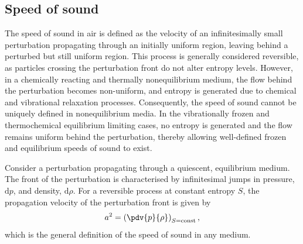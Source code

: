 \subsection{Speed of sound}
The speed of sound in air is defined as the velocity of an infinitesimally small perturbation propagating through an initially uniform region, leaving behind a perturbed but still uniform region. This process is generally considered reversible, as particles crossing the perturbation front do not alter entropy levels. However, in a chemically reacting and thermally nonequilibrium medium, the flow behind the perturbation becomes non-uniform, and entropy is generated due to chemical and vibrational relaxation processes. Consequently, the speed of sound cannot be uniquely defined in nonequilibrium media. In the vibrationally frozen and thermochemical equilibrium limiting cases, no entropy is generated and the flow remains uniform behind the perturbation, thereby allowing well-defined frozen and equilibrium speeds of sound to exist.

Consider a perturbation propagating through a quiescent, equilibrium medium. The front of the perturbation is characterised by infinitesimal jumps in pressure, $\mathrm{d}p$, and density, $\mathrm{d}\rho$. For a reversible process at constant entropy $S$, the propagation velocity of the perturbation front is given by
\begin{equation}
    a^2 = \left(\pdv{p}{\rho}\right)_{S=\text{const}},
\end{equation}
which is the general definition of the speed of sound in any medium.


